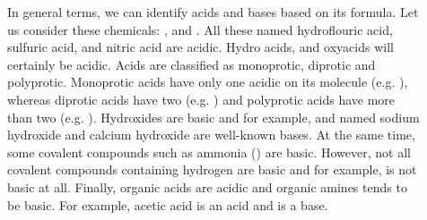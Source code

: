 \documentclass[main.tex]{subfiles}
\begin{document}
\begin{description}
\item[] In general terms, we can identify acids and bases based on its formula. Let us consider these chemicals: ,  and . All these named hydroflouric acid, sulfuric acid, and nitric acid are acidic. Hydro acids, and oxyacids will certainly be acidic. 
Acids are classified as monoprotic, diprotic and polyprotic. Monoprotic acids have only one acidic  on its molecule (e.g. ), whereas diprotic acids have two (e.g. ) and polyprotic acids have more than two (e.g. ).
Hydroxides are basic and for example,  and  named sodium hydroxide and calcium hydroxide are well-known bases. At the same time, some covalent compounds such as ammonia () are basic. However, not all covalent compounds containing hydrogen are basic and for example,  is not basic at all. Finally, organic acids are acidic and organic amines tends to be basic. For example, acetic acid  is an acid and  is a base. 







\end{description}
\end{document}
